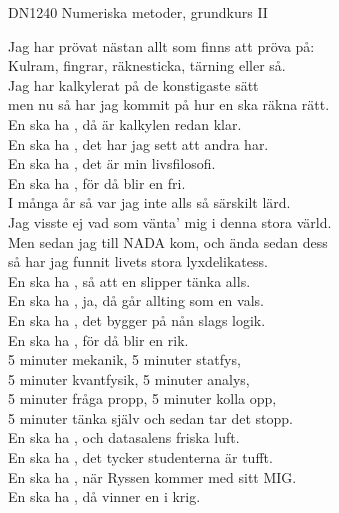 \documentclass[a6paper, 10pt, twoside]{article}
\begin{document}
\noindent
\begin{center}
\footnotesize DN1240 Numeriska metoder, grundkurs II\\
\end{center}
\begin{lyrics}
Jag har prövat nästan allt som finns att pröva på:\\
Kulram, fingrar, räknesticka, tärning eller så.\\
Jag har kalkylerat på de konstigaste sätt\\
men nu så har jag kommit på hur en ska räkna rätt.
\vspace{5pt} \\
En ska ha , då är kalkylen redan klar.\\
En ska ha , det har jag sett att andra har.\\
En ska ha , det är min livsfilosofi.\\
En ska ha , för då blir en fri.
\vspace{5pt} \\
I många år så var jag inte alls så särskilt lärd.\\
Jag visste ej vad som vänta’ mig i denna stora värld.\\
Men sedan jag till NADA kom, och ända sedan dess\\
så har jag funnit livets stora lyxdelikatess.
\vspace{5pt} \\
En ska ha , så att en slipper tänka alls.\\
En ska ha , ja, då går allting som en vals.\\
En ska ha , det bygger på nån slags logik.\\
En ska ha , för då blir en rik.
\vspace{5pt} \\
5 minuter mekanik, 5 minuter statfys,\\
5 minuter kvantfysik, 5 minuter analys,\\
5 minuter fråga propp, 5 minuter kolla opp,\\
5 minuter tänka själv och sedan tar det stopp.
\vspace{5pt} \\
En ska ha , och datasalens friska luft.\\
En ska ha , det tycker studenterna är tufft.\\
En ska ha , när Ryssen kommer med sitt MIG.\\
En ska ha , då vinner en i krig.
\end{lyrics}
\end{document}
